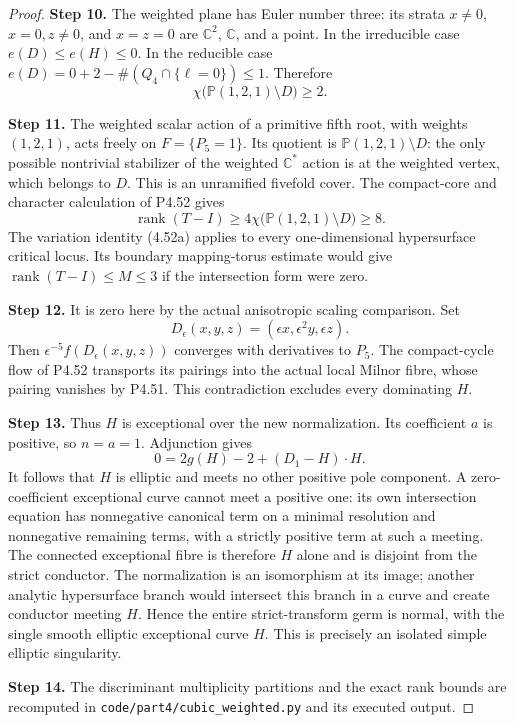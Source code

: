 \begin{proof}
\noindent\textbf{Step 10.} The weighted plane has Euler number three: its
strata $x\ne0$, $x=0,z\ne0$, and $x=z=0$ are
$\mathbb C^2$, $\mathbb C$, and a point.
In the irreducible case $e(D)\le e(H)\le0$.
In the reducible case
$e(D)=0+2-\#(Q_4\cap\{\ell=0\})\le1$.
Therefore
\[
               \chi\bigl(\mathbb P(1,2,1)\setminus D\bigr)
                         \ge2.                            \tag{4.53e}
\]

\noindent\textbf{Step 11.} The weighted scalar action of a primitive fifth
root, with weights $(1,2,1)$, acts freely on
$F=\{P_5=1\}$. Its quotient is
$\mathbb P(1,2,1)\setminus D$: the only possible
nontrivial stabilizer of the weighted
$\mathbb C^*$ action is at the weighted vertex,
which belongs to $D$. This is an unramified
fivefold cover. The compact-core and character
calculation of P4.52 gives
\[
 \operatorname{rank}(T-I)
 \ge4\chi\bigl(\mathbb P(1,2,1)\setminus D\bigr)
 \ge8.
\]
The variation identity (4.52a) applies to every
one-dimensional hypersurface critical locus. Its
boundary mapping-torus estimate would give
$\operatorname{rank}(T-I)\le M\le3$ if the
intersection form were zero.

\noindent\textbf{Step 12.} It is zero here by the actual anisotropic scaling
comparison. Set
\[
 D_\epsilon(x,y,z)=(\epsilon x,\epsilon^2y,\epsilon z).
\]
Then $\epsilon^{-5}f(D_\epsilon(x,y,z))$ converges
with derivatives to $P_5$. The compact-cycle flow
of P4.52 transports its pairings into the actual
local Milnor fibre, whose pairing vanishes by
P4.51. This contradiction excludes every dominating
$H$.

\noindent\textbf{Step 13.} Thus $H$ is exceptional over the new normalization.
Its coefficient $a$ is positive, so $n=a=1$.
Adjunction gives
\[
                    0=2g(H)-2+(D_1-H)\cdot H.
\]
It follows that $H$ is elliptic and meets no other
positive pole component. A zero-coefficient
exceptional curve cannot meet a positive one:
its own intersection equation has nonnegative
canonical term on a minimal resolution and
nonnegative remaining terms, with a strictly
positive term at such a meeting. The connected
exceptional fibre is therefore $H$ alone and is
disjoint from the strict conductor. The
normalization is an isomorphism at its image;
another analytic hypersurface branch would
intersect this branch in a curve and create
conductor meeting $H$. Hence the entire
strict-transform germ is normal, with the single
smooth elliptic exceptional curve $H$. This is
precisely an isolated simple elliptic singularity.

\noindent\textbf{Step 14.} The discriminant multiplicity partitions and the
exact rank bounds are recomputed in
\texttt{code/part4/cubic\_weighted.py} and its
executed output.
\end{proof}


